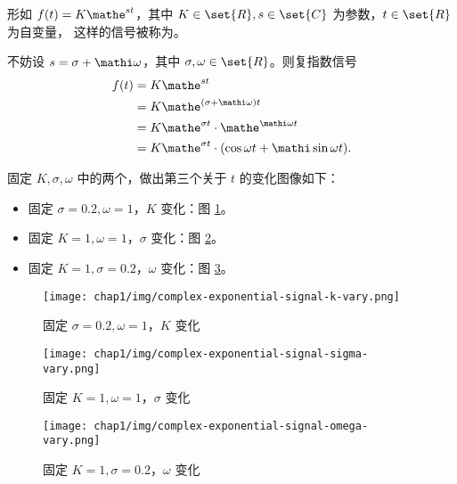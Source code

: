 \begin{definition}[复指数信号]
    形如 $f(t) = K\mathe^{st}$，其中 $K \in \set{R}, s \in \set{C}$ 为参数，$t \in \set{R}$ 为自变量，
    这样的信号被称为。
\end{definition}

\begin{property}[复指数信号与正余弦信号之间的关系]
    不妨设 $s = \sigma + \mathi\omega$，其中 $\sigma, \omega \in \set{R}$。则复指数信号
    \begin{align*}
        f(t) & = K\mathe^{st} \\
        & = K\mathe^{(\sigma + \mathi\omega)t} \\
        & = K\mathe^{\sigma t} \cdot \mathe^{\mathi \omega t} \\
        & = K\mathe^{\sigma t} \cdot (\cos \omega t + \mathi \sin \omega t).
    \end{align*}

    固定 $K, \sigma, \omega$ 中的两个，做出第三个关于 $t$ 的变化图像如下：
    \begin{itemize}
        \item 固定 $\sigma = 0.2, \omega = 1$，$K$ 变化：图 \ref{fig:complex-exponential-signal-k-vary}。
        \item 固定 $K = 1, \omega = 1$，$\sigma$ 变化：图 \ref{fig:complex-exponential-signal-sigma-vary}。
        \item 固定 $K = 1, \sigma = 0.2$，$\omega$ 变化：图 \ref{fig:complex-exponential-signal-omega-vary}。
    \end{itemize}
    \begin{figure}[H]
        \centering
        \texttt{[image: chap1/img/complex-exponential-signal-k-vary.png]}
        \caption{固定 $\sigma = 0.2, \omega = 1$，$K$ 变化}
        \label{fig:complex-exponential-signal-k-vary}
    \end{figure}
    \begin{figure}[H]
        \centering
        \texttt{[image: chap1/img/complex-exponential-signal-sigma-vary.png]}
        \caption{固定 $K = 1, \omega = 1$，$\sigma$ 变化}
        \label{fig:complex-exponential-signal-sigma-vary}
    \end{figure}
    \begin{figure}[H]
        \centering
        \texttt{[image: chap1/img/complex-exponential-signal-omega-vary.png]}
        \caption{固定 $K = 1, \sigma = 0.2$，$\omega$ 变化}
        \label{fig:complex-exponential-signal-omega-vary}
    \end{figure}
\end{property}

